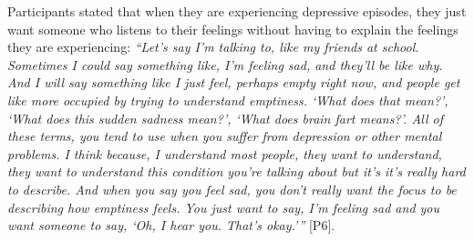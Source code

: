         Participants stated that when they are experiencing depressive episodes, they just want someone who listens to their feelings without having to explain the feelings they are experiencing: 
                \textit{
                ``Let's say I'm talking to, like my friends at school. Sometimes I could say something like, I'm feeling sad, and they'll be like why. And I will say something like I just feel, perhaps empty right now, and people get like more occupied by trying to understand emptiness. `What does that mean?', `What does this sudden sadness mean?', `What does brain fart means?'. All of these terms, you tend to use when you suffer from depression or other mental problems. I think because, I understand most people, they want to understand, they want to understand this condition you're talking about but it's it's really hard to describe. And when you say you feel sad, you don't really want the focus to be  describing how emptiness feels.
                You just want to say, I'm feeling sad and you want someone to say, `Oh, I hear you. That's okay.'''}
                [P6].
        

